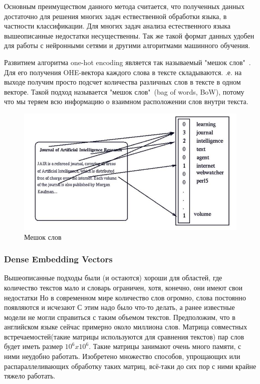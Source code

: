 Основным преимуществом данного метода считается, что полученных данных достаточно для решения многих задач ествественной обработки языка\cite{Book26}, в частности классификации. Для многих задач анализа естественного языка вышеописанные недостатки несущественны. Так же такой формат данных удобен для работы с нейронными сетями и другими алгоритмами машинного обучения.

Развитием алгоритма one-hot encoding является так называемый "мешок слов"\ . Для его получения OHE-вектора каждого слова в тексте складываются. .е. на выходе получим просто подсчет количества различных слов в тексте в одном векторе. Такой подход называется "мешок слов"\ (bag of words, BoW), потому что мы теряем всю информацию о взаимном расположении слов внутри текста.
\begin{figure}[!h]
	\centering
	\includegraphics[width=.5\textwidth]{master_img/wordbag.jpg}
	\caption{Мешок слов}
	\label{fig03_master}
\end{figure}
\subsubsection{Dense Embedding Vectors}

Вышеописанные подходы были (и остаются) хороши для областей, где количество текстов мало и словарь ограничен, хотя, конечно, они имеют свои недостатки Но в современном мире количество слов огромно, слова постоянно появляются и исчезают С этим надо было что-то делать, а ранее известные модели не могли справиться с таким объемом текстов. Предположим, что в английском языке сейчас примерно около миллиона слов. Матрица совместных встречаемостей(такие матрицы используются для сравнения текстов) пар слов будет  иметь размер $10^6 x 10^6$. Такие матрицы занимают очень много памяти, с ними неудобно работать. Изобретено множество способов, упрощающих или распараллеливающих обработку таких матриц, всё-таки до сих пор с ними крайне тяжело работать\cite{Book27}.

